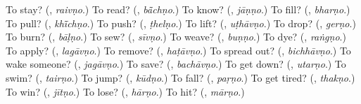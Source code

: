 \begin{tcolorbox}[breakable,colback=teal!4,colframe=teal!35!black,title={Before you move on}]
To stay? (\textbf{}, \emph{raivṇo}.) To read? (\textbf{}, \emph{bā̃chṇo}.) To know? (\textbf{}, \emph{jāṇṇo}.) To fill? (\textbf{}, \emph{bharṇo}.) To pull? (\textbf{}, \emph{khī̃chṇo}.) To push? (\textbf{}, \emph{ṭhelṇo}.) To lift? (\textbf{}, \emph{uṭhāvṇo}.) To drop? (\textbf{}, \emph{gerṇo}.) To burn? (\textbf{}, \emph{bāḷṇo}.) To sew? (\textbf{}, \emph{sīvṇo}.) To weave? (\textbf{}, \emph{buṇṇo}.) To dye? (\textbf{}, \emph{raṅgṇo}.) To apply? (\textbf{}, \emph{lagāvṇo}.) To remove? (\textbf{}, \emph{haṭāvṇo}.) To spread out? (\textbf{}, \emph{bichhāvṇo}.) To wake someone? (\textbf{}, \emph{jagāvṇo}.) To save? (\textbf{}, \emph{bachāvṇo}.) To get down? (\textbf{}, \emph{utarṇo}.) To swim? (\textbf{}, \emph{tairṇo}.) To jump? (\textbf{}, \emph{kūdṇo}.) To fall? (\textbf{}, \emph{paṛṇo}.) To get tired? (\textbf{}, \emph{thakṇo}.) To win? (\textbf{}, \emph{jītṇo}.) To lose? (\textbf{}, \emph{hārṇo}.) To hit? (\textbf{}, \emph{mārṇo}.)
\end{tcolorbox}
